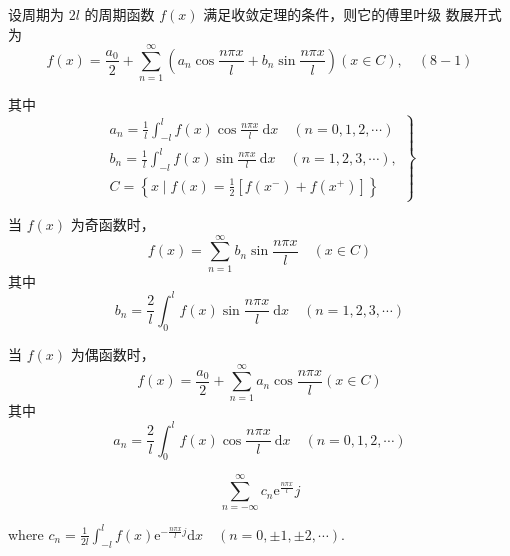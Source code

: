 \begin{theorem}
    设周期为 $ 2 l $ 的周期函数 $ f(x) $ 满足收敛定理的条件，则它的傅里叶级 数展开式为
\begin{equation}
f(x)=\frac{a_{0}}{2}+\sum_{n=1}^{\infty}\left(a_{n} \cos \frac{n \pi x}{l}+b_{n} \sin \frac{n \pi x}{l}\right)(x \in C), \quad(8-1)
\end{equation}

其中
\begin{equation}
\left.\begin{array}{l}
a_{n}=\frac{1}{l} \int_{-l}^{l} f(x) \cos \frac{n \pi x}{l} \mathrm{~d} x \quad(n=0,1,2, \cdots) \\
b_{n}=\frac{1}{l} \int_{-l}^{l} f(x) \sin \frac{n \pi x}{l} \mathrm{~d} x \quad(n=1,2,3, \cdots), \\
C=\left\{x \mid f(x)=\frac{1}{2}\left[f\left(x^{-}\right)+f\left(x^{+}\right)\right]\right\}
\end{array}\right\}
\end{equation}



当 $ f(x) $ 为奇函数时，
\begin{equation}
f(x)=\sum_{n=1}^{\infty} b_{n} \sin \frac{n \pi x}{l} \quad(x \in C)
\end{equation}
其中
\begin{equation}
b_{n}=\frac{2}{l} \int_{0}^{l} f(x) \sin \frac{n \pi x}{l} \mathrm{~d} x \quad(n=1,2,3, \cdots)
\end{equation}

当 $ f(x) $ 为偶函数时，
\begin{equation}
f(x)=\frac{a_{0}}{2}+\sum_{n=1}^{\infty} a_{n} \cos \frac{n \pi x}{l}(x \in C)
\end{equation}
其中
\begin{equation}
a_{n}=\frac{2}{l} \int_{0}^{l} f(x) \cos \frac{n \pi x}{l} \mathrm{~d} x \quad(n=0,1,2, \cdots)
\end{equation}
\end{theorem}

\begin{definition}[傅里叶级数的复数形式]
    \begin{equation} \sum_{n=-\infty}^{\infty} c_{n} \mathrm{e}^{\frac{n \pi x}{l}}j \end{equation}

    where $c_{n}=\frac{1}{2 l} \int_{-l}^{l} f(x) \mathrm{e}^{-\frac{n \pi x}{l} j} \mathrm{d} x \quad(n=0, \pm 1, \pm 2, \cdots) $.
\end{definition}

